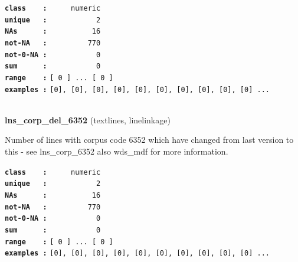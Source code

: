 \documentclass[]{article}
\begin{document}
\textbf{\texttt{class\ \ \ \ :}} \texttt{~~~~~numeric}\\
\textbf{\texttt{unique\ \ \ :}} \texttt{~~~~~~~~~~~2}\\
\textbf{\texttt{NAs\ \ \ \ \ \ :}} \texttt{~~~~~~~~~~16}\\
\textbf{\texttt{not-NA\ \ \ :}} \texttt{~~~~~~~~~770}\\
\textbf{\texttt{not-0-NA\ :}} \texttt{~~~~~~~~~~~0}\\
\textbf{\texttt{sum\ \ \ \ \ \ :}} \texttt{~~~~~~~~~~~0}\\
\textbf{\texttt{range\ \ \ \ :}}
\texttt{{[}\ 0\ {]}\ ...\ {[}\ 0\ {]}}\\
\textbf{\texttt{examples\ :}}
\texttt{{[}0{]},\ {[}0{]},\ {[}0{]},\ {[}0{]},\ {[}0{]},\ {[}0{]},\ {[}0{]},\ {[}0{]},\ {[}0{]},\ {[}0{]}\ ...}\\

~

\textbf{lns\_corp\_del\_6352} (textlines, linelinkage)

Number of lines with corpus code 6352 which have changed from last
version to this - see lns\_corp\_6352 also wds\_mdf for more
information.

\textbf{\texttt{class\ \ \ \ :}} \texttt{~~~~~numeric}\\
\textbf{\texttt{unique\ \ \ :}} \texttt{~~~~~~~~~~~2}\\
\textbf{\texttt{NAs\ \ \ \ \ \ :}} \texttt{~~~~~~~~~~16}\\
\textbf{\texttt{not-NA\ \ \ :}} \texttt{~~~~~~~~~770}\\
\textbf{\texttt{not-0-NA\ :}} \texttt{~~~~~~~~~~~0}\\
\textbf{\texttt{sum\ \ \ \ \ \ :}} \texttt{~~~~~~~~~~~0}\\
\textbf{\texttt{range\ \ \ \ :}}
\texttt{{[}\ 0\ {]}\ ...\ {[}\ 0\ {]}}\\
\textbf{\texttt{examples\ :}}
\texttt{{[}0{]},\ {[}0{]},\ {[}0{]},\ {[}0{]},\ {[}0{]},\ {[}0{]},\ {[}0{]},\ {[}0{]},\ {[}0{]},\ {[}0{]}\ ...}\\

~
\end{document}
